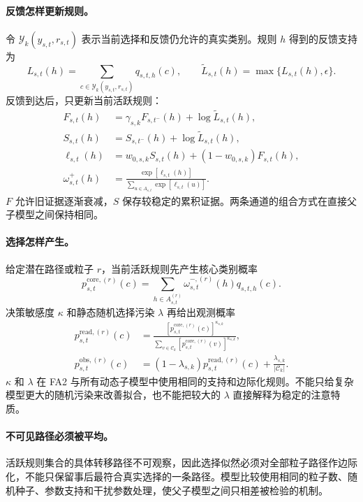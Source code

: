\paragraph{反馈怎样更新规则。}
令 $\mathcal Y_k(y_{s,t},r_{s,t})$ 表示当前选择和反馈仍允许的真实类别。规则 $h$ 得到的反馈支持为
\begin{equation}
L_{s,t}(h)
=\sum_{c\in\mathcal Y_k(y_{s,t},r_{s,t})}q_{s,t,h}(c),
\qquad \widetilde L_{s,t}(h)=\max\{L_{s,t}(h),\epsilon\}.
\label{eq:model0806-feedback-support}
\end{equation}
反馈到达后，只更新当前活跃规则：
\begin{align}
F_{s,t}(h)
&=\gamma_{s,k}F_{s,t^-}(h)+\log\widetilde L_{s,t}(h),\\
S_{s,t}(h)
&=S_{s,t^-}(h)+\log\widetilde L_{s,t}(h),\\
\ell_{s,t}(h)
&=w_{0,s,k}S_{s,t}(h)+(1-w_{0,s,k})F_{s,t}(h),\\
\omega^+_{s,t}(h)
&=\frac{\exp[\ell_{s,t}(h)]}
{\sum_{u\in A_{s,t}}\exp[\ell_{s,t}(u)]}.
\label{eq:model0806-active-update}
\end{align}
$F$ 允许旧证据逐渐衰减，$S$ 保存较稳定的累积证据。两条通道的组合方式在直接父子模型之间保持相同。

\paragraph{选择怎样产生。}
给定潜在路径或粒子 $r$，当前活跃规则先产生核心类别概率
\begin{equation}
p^{\mathrm{core},(r)}_{s,t}(c)
=\sum_{h\in A^{(r)}_{s,t}}
\omega^{-,(r)}_{s,t}(h)q_{s,t,h}(c).
\end{equation}
决策敏感度 $\kappa$ 和静态随机选择污染 $\lambda$ 再给出观测概率
\begin{align}
p^{\mathrm{read},(r)}_{s,t}(c)
&=\frac{[p^{\mathrm{core},(r)}_{s,t}(c)]^{\kappa_{s,k}}}
{\sum_{v\in\mathcal C_k}[p^{\mathrm{core},(r)}_{s,t}(v)]^{\kappa_{s,k}}},\\
p^{\mathrm{obs},(r)}_{s,t}(c)
&=(1-\lambda_{s,k})p^{\mathrm{read},(r)}_{s,t}(c)
+\frac{\lambda_{s,k}}{|\mathcal C_k|}.
\label{eq:model0806-choice-readout}
\end{align}
$\kappa$ 和 $\lambda$ 在 FA2 与所有动态子模型中使用相同的支持和边际化规则。不能只给复杂模型更大的随机污染来改善拟合，也不能把较大的 $\lambda$ 直接解释为稳定的注意特质。

\paragraph{不可见路径必须被平均。}
活跃规则集合的具体转移路径不可观察，因此选择似然必须对全部粒子路径作边际化，不能只保留事后最符合真实选择的一条路径。模型比较使用相同的粒子数、随机种子、参数支持和干扰参数处理，使父子模型之间只相差被检验的机制。



